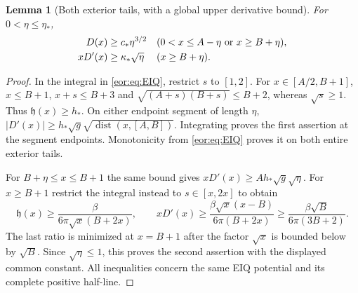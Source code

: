 \documentclass[11pt,a4paper]{article}
\newtheorem{lemma}[theorem]{Lemma}
\begin{document}
\begin{lemma}[Both exterior tails, with a global upper derivative bound]
For $0<\eta\le\eta_*$,
\begin{equation}
\begin{aligned}
 D(x)&\ge c_*\eta^{3/2}
        &&(0<x\le A-\eta\ \hbox{or}\ x\ge B+\eta),\\
 xD'(x)&\ge\kappa_*\sqrt\eta&& (x\ge B+\eta).
\end{aligned}\label{eor:eq:gap}
\end{equation}
\end{lemma}
\begin{proof}
In the integral in \eqref{eor:eq:EIQ}, restrict $s$ to $[1,2]$. For
$x\in[A/2,B+1]$, $x\le B+1$, $x+s\le B+3$ and
$\sqrt{(A+s)(B+s)}\le B+2$, whereas $\sqrt s\ge1$.
Thus $\mathfrak h(x)\ge h_*$. On either endpoint segment of length $\eta$,
$|D'(x)|\ge h_*\sqrt g\sqrt{\operatorname{dist}(x,[A,B])}$.
Integrating proves the first assertion at the segment endpoints. Monotonicity
from \eqref{eor:eq:EIQ} proves it on both entire exterior tails.

For $B+\eta\le x\le B+1$ the same bound gives
$xD'(x)\ge A h_*\sqrt g\sqrt\eta$.
For $x\ge B+1$ restrict the integral instead to $s\in[x,2x]$ to obtain
\[
 \mathfrak h(x)\ge\frac{\beta}{6\pi\sqrt x(B+2x)},\qquad
 xD'(x)\ge\frac{\beta\sqrt x(x-B)}{6\pi(B+2x)}
 \ge\frac{\beta\sqrt B}{6\pi(3B+2)}.
\]
The last ratio is minimized at $x=B+1$ after the factor $\sqrt x$ is bounded
below by $\sqrt B$. Since $\sqrt\eta\le1$, this proves the second assertion
with the displayed common constant. All inequalities concern the same EIQ
potential and its complete positive half-line.
\end{proof}
\end{document}
